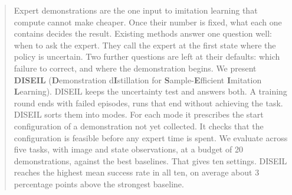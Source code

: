 \begin{abstract}
Expert demonstrations are the one input to imitation learning that compute
cannot make cheaper. Once their number is fixed, what each one contains decides
the result. Existing methods answer one question well: when to ask the expert.
They call the expert at the first state where the policy is uncertain. Two
further questions are left at their defaults: which failure to correct, and
where the demonstration begins. We present \textbf{DISEIL}
(\textbf{D}emonstration d\textbf{I}stillation for \textbf{S}ample-\textbf{E}fficient
\textbf{I}mitation \textbf{L}earning). DISEIL keeps the uncertainty test and
answers both. A training round ends with failed episodes, runs that end without
achieving the task. DISEIL sorts them into modes. For each mode it prescribes
the start configuration of a demonstration not yet collected. It checks that
the configuration is feasible before any expert time is spent. We evaluate
across five tasks, with image and state observations, at a budget of 20
demonstrations, against the best baselines. That gives ten settings. DISEIL
reaches the highest mean success rate in all ten, on average about 3 percentage
points above the strongest baseline.
\end{abstract}
